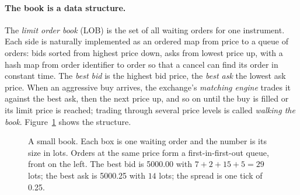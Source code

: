 \paragraph{The book is a data structure.}
The \emph{limit order book} (LOB) is the set of all waiting orders for one instrument. Each side is
naturally implemented as an ordered map from price to a queue of orders: bids sorted from highest
price down, asks from lowest price up, with a hash map from order identifier to order so that a
cancel can find its order in constant time. The \emph{best bid} is the highest bid price, the
\emph{best ask} the lowest ask price. When an aggressive buy arrives, the exchange's
\emph{matching engine} trades it against the best ask, then the next price up, and so on until the
buy is filled or its limit price is reached; trading through several price levels is called
\emph{walking the book}. Figure~\ref{fig:book} shows the structure.

\begin{figure}[ht]
\centering
{}
\caption{A small book. Each box is one waiting order and the number is its size in lots. Orders at
the same price form a first-in-first-out queue, front on the left. The best bid is 5000.00 with
$7+2+15+5 = 29$ lots; the best ask is 5000.25 with $14$ lots; the spread is one tick of 0.25.}
\label{fig:book}
\end{figure}

